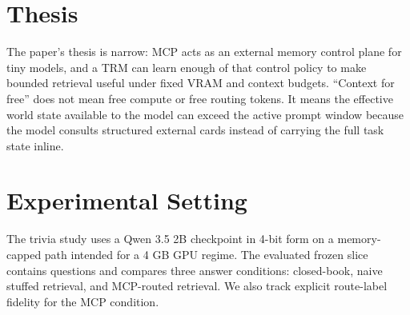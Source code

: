 \documentclass[11pt]{article}
\title{\PaperTitle}
\author{Patri Friedman and Codex}
\date{April 17, 2026}
\begin{document}
\maketitle

\begin{abstract}
We study whether a tiny transformer router model (TRM) can turn MCP from a prompt-formatting trick into a real context-extension mechanism for small language models running under hard memory limits. The core claim is operational rather than mystical: a 2B model does not need to carry the whole world in its prompt if MCP cards and route policies let it pull only the relevant fragments at answer time. Two environment studies support that claim. In a storyworld pipeline, context-bounded MCP packets let small models operate over outputs far larger than the active prompt window while preserving structured phase behavior. In a frozen trivia benchmark, the same 2B model on a capped 4-bit path rises from \TriviaClosedSafe{} closed-book accuracy to \TriviaMcpSafe{} with MCP-routed retrieval on \TriviaQuestionCount{} questions, while using \TriviaRetrievedSafe{} retrieved tokens on average. The remaining weakness is route faithfulness: the safe trained adapter still reaches only \TriviaRouteSafe{} route accuracy even when answer accuracy is perfect.
\end{abstract}

\section{Thesis}
The paper's thesis is narrow: MCP acts as an external memory control plane for tiny models, and a TRM can learn enough of that control policy to make bounded retrieval useful under fixed VRAM and context budgets. ``Context for free'' does not mean free compute or free routing tokens. It means the effective world state available to the model can exceed the active prompt window because the model consults structured external cards instead of carrying the full task state inline.

\section{Experimental Setting}
The trivia study uses a Qwen 3.5 2B checkpoint in 4-bit form on a memory-capped path intended for a 4 GB GPU regime. The evaluated frozen slice contains \TriviaQuestionCount{} questions and compares three answer conditions: closed-book, naive stuffed retrieval, and MCP-routed retrieval. We also track explicit route-label fidelity for the MCP condition.
\end{document}
